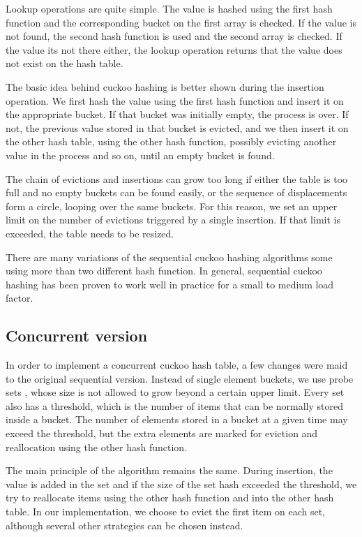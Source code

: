 Lookup operations are quite simple. The value is hashed using the first hash function and the corresponding bucket on the first array is checked. If the value is not found, the second hash function is used and the second array is  checked.  If the value its not there either, the lookup operation returns that the value does not exist on the hash table.

The basic idea behind cuckoo hashing is better shown during the insertion operation. We first hash the value using the first hash function and insert it on the appropriate bucket. If that bucket was initially empty, the process is over. If not, the previous value stored in that bucket is evicted, and we then insert it  on the other hash table, using the other hash function, possibly evicting another value in the process and so on, until an empty bucket is found.


The chain of evictions and insertions can grow too long if either the table is too full and no empty buckets can be found easily, or the sequence of displacements form a circle, looping over the same buckets. For this reason, we set an upper limit on the number of evictions triggered by a single insertion. If that limit is exceeded, the table needs to be resized.

There are many variations of the sequential cuckoo hashing algorithms some using more than two different hash function. In general, sequential cuckoo hashing has been proven to work well in practice for a small  to medium load factor.

\subsection{Concurrent version}

In order to implement a concurrent cuckoo hash table, a few changes were maid to the original sequential version. Instead of single element buckets, we use probe sets , whose size is not allowed to grow beyond a certain upper limit. Every set also has a threshold, which is the number of items that can be normally stored inside a bucket. The number of elements stored in a bucket at a given time may exceed the threshold, but the extra elements are marked for eviction and reallocation using the other hash function.

The main principle of the algorithm remains the same. During insertion, the value is added in the set and if the size of the set hash exceeded the threshold, we try to reallocate items using the other hash function and into the other hash table.  In our implementation, we choose to evict the first item on each set, although several other strategies can be chosen instead.

